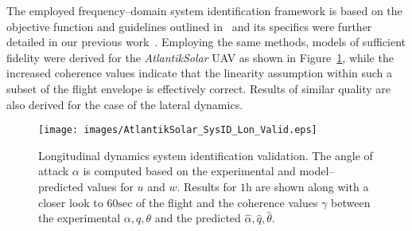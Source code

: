 The employed frequency--domain system identification framework is based on the objective function and guidelines outlined in~\cite{TISCHLER_BOOK} and its specifics were further detailed in our previous work~\cite{Oettershagen_MED14_L1MPC}. Employing the same methods, models of sufficient fidelity were derived for the \textit{AtlantikSolar} UAV as shown in Figure~\ref{SysID_LonValid}, while the increased coherence values indicate that the linearity assumption within such a subset of the flight envelope is effectively correct. Results of similar quality are also derived for the case of the lateral dynamics. 

%
\begin{figure}[htbp]
\centering
  \texttt{[image: images/AtlantikSolar\_SysID\_Lon\_Valid.eps]}
\caption{Longitudinal dynamics system identification validation. The angle of attack $\alpha$ is computed based on the experimental and model--predicted values for $u$ and $w$. Results for $1\textrm{h}$ are shown along with a closer look to $60\textrm{sec}$ of the flight and the coherence values $\gamma$ between the experimental $\alpha,q,\theta$ and the predicted $\hat{\alpha},\hat{q},\hat{\theta}$. }
\label{SysID_LonValid}
\end{figure}
% 